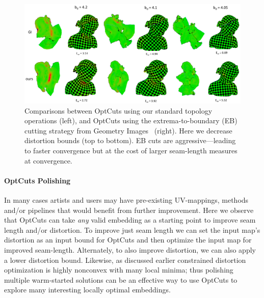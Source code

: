 \begin{figure}[t]
\centering
\includegraphics[width=0.8\linewidth]{fig/comp_GI.png}
\vspace{-0.3cm}
\caption{Comparisons between OptCuts using our standard topology operations (left), and OptCuts using the extrema-to-boundary (EB) cutting strategy from Geometry Images~\cite{Gu2002Geometry} (right). Here we decrease distortion bounds (top to bottom). EB cuts are aggressive---leading to faster convergence but at the cost of larger seam-length measures at convergence.}
\vspace{-0.3cm}
\label{fig:comp_GI}
\end{figure}

\paragraph{OptCuts Polishing}

In many cases artists and users may have pre-existing UV-mappings, methods and/or pipelines that would benefit from further improvement. Here we observe that OptCuts can take \emph{any} valid embedding as a starting point to improve seam length and/or distortion. To improve just seam length we can set the input map's distortion as an input bound for OptCuts and then optimize the input map for improved seam-length. Alternately, to also improve distortion, we can also apply a lower distortion bound. Likewise, as discussed earlier constrained distortion optimization is highly nonconvex with many local minima; thus polishing multiple warm-started solutions can be an effective way to use OptCuts to explore many interesting locally optimal embeddings.

